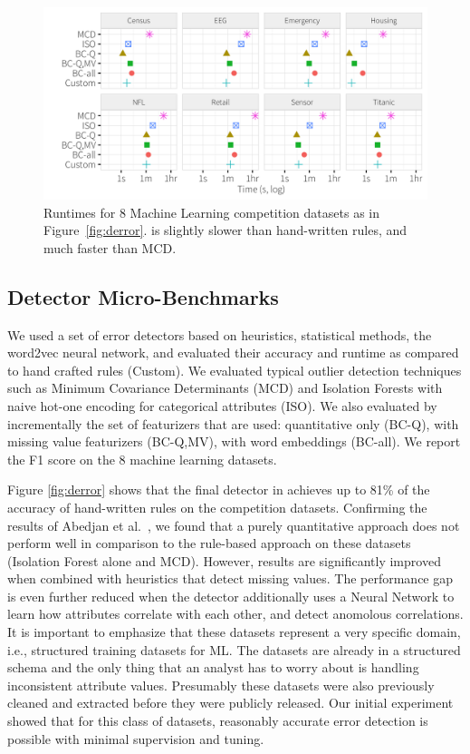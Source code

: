\begin{figure}[t]
\centering
 \includegraphics[width=\columnwidth]{exp/druntime.png}
 \caption{Runtimes for 8 Machine Learning competition datasets as in Figure~\ref{fig:derror}. \sys is slightly slower than hand-written rules, and much faster than MCD.
 \label{fig:druntime}}
\end{figure}

\subsection{Detector Micro-Benchmarks}

We used a set of error detectors based on heuristics, statistical methods, the word2vec neural network, and evaluated their accuracy and runtime as compared to hand crafted rules (Custom).  We evaluated typical outlier detection techniques such as Minimum Covariance Determinants (MCD) and Isolation Forests with naive hot-one encoding for categorical attributes (ISO).  We also evaluated \sys by incrementally the set of featurizers that are used: quantitative only (BC-Q), with  missing value featurizers (BC-Q,MV), with word embeddings (BC-all).  We report the F1 score on the 8 machine learning datasets.

Figure  \ref{fig:derror} shows that the final detector in \sys achieves up to 81\% of the accuracy of hand-written rules on the competition datasets.
Confirming the results of Abedjan et al.~\cite{DBLP:journals/pvldb/AbedjanCDFIOPST16}, we found that a 
purely quantitative approach does not perform well in comparison to the rule-based approach on these datasets (Isolation Forest alone and MCD).
However, results are significantly improved when combined with heuristics that detect missing values. 
The performance gap is even further reduced when the detector additionally uses a Neural Network to learn how attributes correlate with each other, and detect anomolous correlations.
It is important to emphasize that these datasets represent a very specific domain, i.e., structured training datasets for ML.
The datasets are already in a structured schema and the only thing that an analyst has to worry about is handling inconsistent attribute values.
Presumably these datasets were also previously cleaned and extracted before they were publicly released.
Our initial experiment showed that for this class of datasets, reasonably accurate error detection is possible with minimal supervision and tuning.

